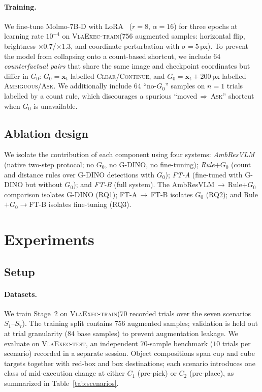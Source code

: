 \documentclass{article}
\newcommand{\datasettrain}{\textsc{VlaExec-train}}
\newcommand{\datasettest}{\textsc{VlaExec-test}}
\begin{document}
\paragraph{Training.}
We fine-tune Molmo-7B-D with LoRA~\cite{lora}
($r=8,\,\alpha=16$) for three epochs at learning rate $10^{-4}$ on
\datasettrain ($756$ augmented samples: horizontal flip,
brightness $\times 0.7$/$\times 1.3$, and coordinate perturbation with
$\sigma=5$\,px). To prevent the model from collapsing onto a
count-based shortcut, we include $64$ \emph{counterfactual pairs} that
share the same image and checkpoint coordinates but differ in $G_0$:
$G_0=\mathbf{x}_t$ labelled \textsc{Clear}/\textsc{Continue}, and
$G_0=\mathbf{x}_t+200$\,px labelled \textsc{Ambiguous}/\textsc{Ask}. We
additionally include $64$ ``no-$G_0$'' samples on $n=1$ trials labelled
by a count rule, which discourages a spurious
``moved$\,\Rightarrow\,$\textsc{Ask}'' shortcut when $G_0$ is
unavailable.

\subsection{Ablation design}

We isolate the contribution of each component using four systems:
\emph{AmbResVLM} (native two-step protocol; no $G_0$, no G-DINO, no
fine-tuning); \emph{Rule}$+G_0$ (count and distance rules over G-DINO
detections with $G_0$); \emph{FT-A} (fine-tuned with G-DINO but without
$G_0$); and \emph{FT-B} (full system). The AmbResVLM$\,\to\,$Rule$+G_0$
comparison isolates G-DINO (RQ1); FT-A$\,\to\,$FT-B isolates $G_0$
(RQ2); and Rule$+G_0\to$FT-B isolates fine-tuning (RQ3).

\section{Experiments}
\label{sec:exp}

\subsection{Setup}

\paragraph{Datasets.}
We train Stage~2 on \datasettrain ($70$ recorded trials
over the seven scenarios $S_1$--$S_7$). The training split contains
$756$ augmented samples; validation is held out at trial granularity
($84$ base samples) to prevent augmentation leakage. We evaluate on
\datasettest, an independent $70$-sample benchmark ($10$
trials per scenario) recorded in a separate session. Object compositions
span cup and cube targets together with red-box and box destinations;
each scenario introduces one class of mid-execution change at either
$C_1$ (pre-pick) or $C_2$ (pre-place), as summarized in
Table~\ref{tab:scenarios}.
\end{document}
